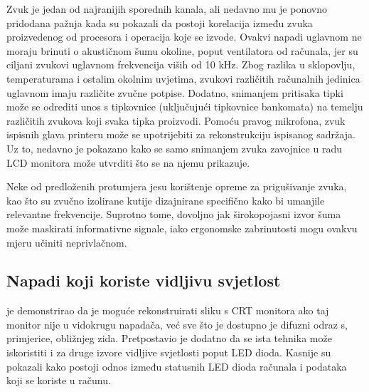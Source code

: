 \documentclass[times, utf8, diplomski]{fer}
\begin{document}
Zvuk je jedan od najranijih sporednih kanala, ali nedavno mu je ponovno pridodana pažnja kada su \cite{shamir2004acoustic} pokazali da postoji korelacija između zvuka proizvedenog od procesora i operacija koje se izvode. Ovakvi napadi uglavnom ne moraju brinuti o akustičnom šumu okoline, poput ventilatora od računala, jer su ciljani zvukovi uglavnom frekvencija viših od 10 kHz. Zbog razlika u sklopovlju, temperaturama i ostalim okolnim uvjetima, zvukovi različitih računalnih jedinica uglavnom imaju različite zvučne potpise. Dodatno, snimanjem pritisaka tipki može se odrediti unos s tipkovnice (uključujući tipkovnice bankomata) na temelju različitih zvukova koji svaka tipka proizvodi. Pomoću pravog mikrofona, zvuk ispisnih glava printeru može se upotrijebiti za rekonstrukciju ispisanog sadržaja. Uz to, nedavno je pokazano kako se samo snimanjem zvuka zavojnice  u radu LCD monitora može utvrditi što se na njemu prikazuje.

Neke od predloženih protumjera jesu korištenje opreme za prigušivanje zvuka, kao što su zvučno izolirane kutije dizajnirane specifično kako bi umanjile relevantne frekvencije. Suprotno tome, dovoljno jak širokopojasni izvor šuma može maskirati informativne signale, iako ergonomske zabrinutosti mogu ovakvu mjeru učiniti neprivlačnom.

\subsection{Napadi koji koriste vidljivu svjetlost}
\cite{kuhn2002optical} je demonstrirao da je moguće rekonstruirati sliku s CRT monitora ako taj monitor nije u vidokrugu napadača, već sve što je dostupno je difuzni odraz s, primjerice, obližnjeg zida. Pretpostavio je dodatno da se ista tehnika može iskoristiti i za druge izvore vidljive svjetlosti poput LED dioda. Kasnije su \cite{loughry2002information} pokazali kako postoji odnos između statusnih LED dioda računala i podataka koji se koriste u računu.
\end{document}
